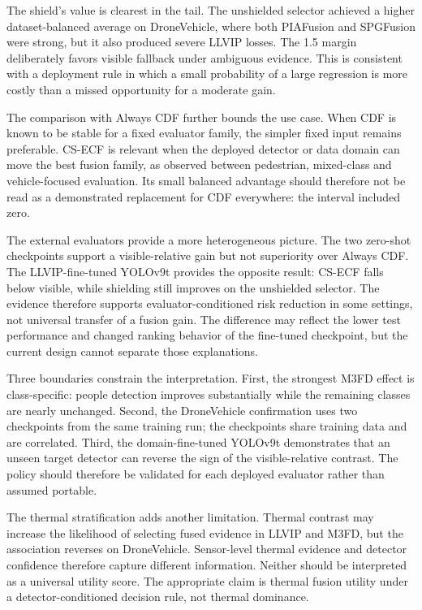 \documentclass[preprint,11pt]{elsarticle}
\begin{document}
The shield's value is clearest in the tail. The unshielded selector achieved a
higher dataset-balanced average on DroneVehicle, where both PIAFusion and
SPGFusion were strong, but it also produced severe LLVIP losses. The 1.5 margin
deliberately favors visible fallback under ambiguous evidence. This is
consistent with a deployment rule in which a small probability of a large
regression is more costly than a missed opportunity for a moderate gain.

The comparison with Always CDF further bounds the use case. When CDF is known
to be stable for a fixed evaluator family, the simpler fixed input remains
preferable. CS-ECF is relevant when the deployed detector or data domain can
move the best fusion family, as observed between pedestrian, mixed-class and
vehicle-focused evaluation. Its small balanced advantage should therefore not
be read as a demonstrated replacement for CDF everywhere: the interval
included zero.

The external evaluators provide a more heterogeneous picture. The two zero-shot
checkpoints support a visible-relative gain but not superiority over Always CDF.
The LLVIP-fine-tuned YOLOv9t provides the opposite result: CS-ECF falls below
visible, while shielding still improves on the unshielded selector. The evidence
therefore supports evaluator-conditioned risk reduction in some settings, not
universal transfer of a fusion gain. The difference may reflect the lower test
performance and changed ranking behavior of the fine-tuned checkpoint, but the
current design cannot separate those explanations.

Three boundaries constrain the interpretation. First, the strongest M3FD effect
is class-specific: people detection improves substantially while the remaining
classes are nearly unchanged. Second, the DroneVehicle confirmation uses two
checkpoints from the same training run; the checkpoints share training data and
are correlated. Third, the domain-fine-tuned YOLOv9t demonstrates that an
unseen target detector can reverse the sign of the visible-relative contrast.
The policy should therefore be validated for each deployed evaluator rather
than assumed portable.

The thermal stratification adds another limitation. Thermal contrast may
increase the likelihood of selecting fused evidence in LLVIP and M3FD, but the
association reverses on DroneVehicle. Sensor-level thermal evidence and
detector confidence therefore capture different information. Neither should be
interpreted as a universal utility score. The appropriate claim is thermal
fusion utility under a detector-conditioned decision rule, not thermal dominance.
\end{document}
